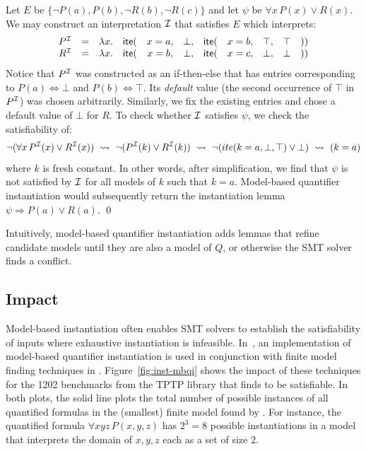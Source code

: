 \documentclass[oribibl]{llncs}
\begin{document}
\begin{example}
Let $E$ be $\{ \neg P( a ), P( b ), \neg R( b ), \neg R( c ) \}$ and let $\psi$ be $\forall x\, P( x ) \vee R( x )$.
We may construct an interpretation $\mathcal{I}$ that satisfies $E$ which interprets:
\[
\begin{array}{rcccccccccc}
P^{\mathcal{I}} & = & \lambda x. & \mathsf{ite}( & x=a, & \bot, & \mathsf{ite}( & x=b, & \top, & \top  & )) \\
R^{\mathcal{I}} & = & \lambda x. & \mathsf{ite}( & x=b, & \bot, & \mathsf{ite}( & x=c, & \bot, & \bot  & )) \\
\end{array}
\]
Notice that $P^{\mathcal{I}}$ was constructed as an if-then-else that has entries corresponding to $P( a ) \Leftrightarrow \bot$
and $P( b ) \Leftrightarrow \top$. Its \emph{default} value (the second occurrence of $\top$ in $P^{\mathcal{I}}$) was chosen arbitrarily.
Similarly, we fix the existing entries and chose a default value of $\bot$ for $R$.
To check whether $\mathcal{I}$ satisfies $\psi$, we check the satisfiability of:
\[
\neg ( \forall x\, P^{\mathcal{I}}( x ) \vee R^{\mathcal{I}}( x ) ) \ \leadsto \  \neg ( P^{\mathcal{I}}( k ) \vee R^{\mathcal{I}}( k ) ) \ \leadsto \  \neg ( ite( k=a, \bot, \top) \vee \bot ) \ \leadsto \  ( k = a )
\]
where $k$ is fresh constant.
In other words, after simplification, we find that $\psi$ is not satisfied by $\mathcal{I}$ for all models of $k$ such that $k = a$.
Model-based quantifier instantiation would subsequently return the instantiation lemma $\psi \Rightarrow P( a ) \vee R( a )$.
\qed
\end{example}
Intuitively,
model-based quantifier instantiation adds lemmas that refine candidate models
until they are also a model of $Q$, or otherwise the SMT solver finds a conflict.


\subsection{Impact}
Model-based instantiation often enables SMT solvers to
establish the satisfiability of inputs where exhaustive instantiation is infeasible.
In~\cite{ReyEtAl-CADE-13}, an implementation of model-based quantifier instantiation is used
in conjunction with finite model finding techniques in \cvc.
Figure~\ref{fig:inst-mbqi} shows the impact of these techniques for the 1202
benchmarks from the TPTP library that \cvc finds to be satisfiable.
In both plots, the solid line plots the total number of possible instances of all quantified formulas
in the (smallest) finite model found by \cvc.
For instance, the quantified formula $\forall xyz\, P( x, y, z )$ has $2^3 = 8$ possible instantiations
in a model that interprets the domain of $x,y,z$ each as a set of size $2$.
\end{document}

